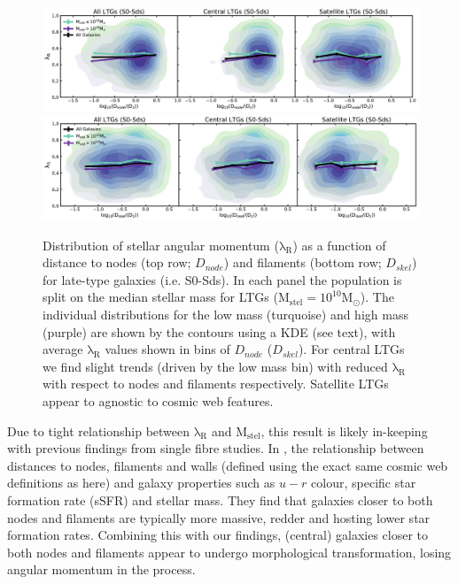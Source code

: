 \begin{figure}
    \centering\includegraphics[width=\linewidth]{thesis/latex/cw_spin/ltg_lambdaR_dnode_mass_split_3sigma.pdf} \\
    \centering\includegraphics[width=\linewidth]{thesis/latex/cw_spin/ltg_lambdaR_dskel_mass_split_3sigma.pdf}
    \caption{Distribution of stellar angular momentum ($\mathrm{\lambda_R}$) as a function of distance to nodes (top row; $D_{node}$) and filaments (bottom row; $D_{skel}$) for late-type galaxies (i.e. S0-Sds). In each panel the population is split on the median stellar mass for LTGs ($\mathrm{M_{stel} = 10^{10}M_{\odot}}$). The individual distributions for the low mass (turquoise) and high mass (purple) are shown by the contours using a KDE (see text), with average $\mathrm{\lambda_R}$ values shown in bins of $D_{node}$ ($D_{skel}$). For central LTGs we find slight trends (driven by the low mass bin) with reduced $\mathrm{\lambda_R}$ with respect to nodes and filaments respectively. Satellite LTGs appear to agnostic to cosmic web features.}
\label{fig:ltg_lambdaR_skel}
\end{figure} 

Due to tight relationship between $\mathrm{\lambda_R}$ and $\mathrm{M_{stel}}$, this result is likely in-keeping with previous findings from single fibre studies. In \citet{kraljic2018}, the relationship between distances to nodes, filaments and walls (defined using the exact same cosmic web definitions as here) and galaxy properties such as $u - r$ colour, specific star formation rate (sSFR) and stellar mass. They find that galaxies closer to both nodes and filaments are typically more massive, redder and hosting lower star formation rates. Combining this with our findings, (central) galaxies closer to both nodes and filaments appear to undergo morphological transformation, losing angular momentum in the process.

